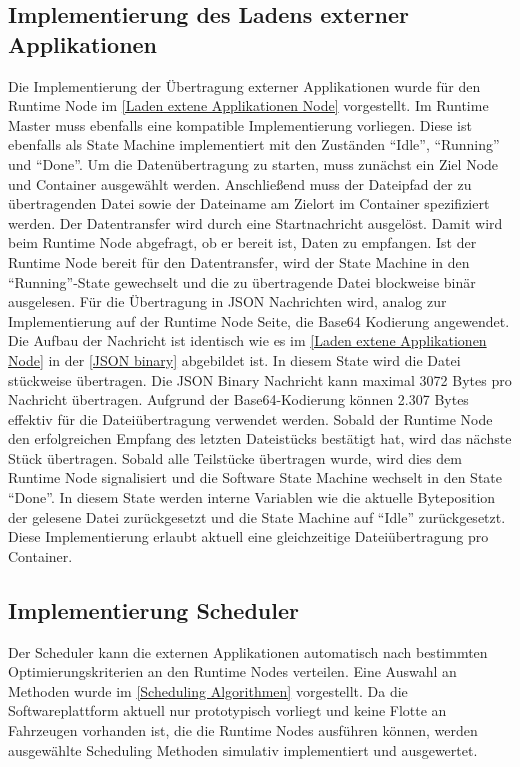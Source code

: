 \subsection{Implementierung des Ladens externer Applikationen}

Die Implementierung der Übertragung externer Applikationen wurde für den Runtime Node im \autoref{Laden extene Applikationen Node} vorgestellt. Im Runtime Master muss ebenfalls eine kompatible Implementierung vorliegen. Diese ist ebenfalls als State Machine implementiert mit den Zuständen \enquote{Idle}, \enquote{Running} und \enquote{Done}. Um die Datenübertragung zu starten, muss zunächst ein Ziel Node und  Container ausgewählt werden. Anschließend muss der Dateipfad der zu übertragenden Datei sowie der Dateiname am Zielort im Container spezifiziert werden. Der Datentransfer wird durch eine Startnachricht ausgelöst. Damit wird beim Runtime Node abgefragt, ob er bereit ist, Daten zu empfangen. Ist der Runtime Node bereit für den Datentransfer, wird der State Machine in den \enquote{Running}-State gewechselt und die zu übertragende Datei blockweise binär ausgelesen. Für die Übertragung in \gls{JSON} Nachrichten wird, analog zur Implementierung auf der Runtime Node Seite, die Base64 Kodierung angewendet. Die Aufbau der Nachricht ist identisch wie es im \autoref{Laden extene Applikationen Node} in der \autoref{JSON binary} abgebildet ist. In diesem State wird die Datei stückweise übertragen. Die \gls{JSON} Binary Nachricht kann maximal 3072 Bytes pro Nachricht übertragen. Aufgrund der Base64-Kodierung können 2.307 Bytes effektiv für die Dateiübertragung verwendet werden. Sobald der Runtime Node den erfolgreichen Empfang des letzten Dateistücks bestätigt hat, wird das nächste Stück übertragen. Sobald alle Teilstücke übertragen wurde, wird dies dem Runtime Node signalisiert und die Software State Machine wechselt in den State \enquote{Done}. In diesem State werden interne Variablen wie die aktuelle Byteposition der gelesene Datei zurückgesetzt und die State Machine auf \enquote{Idle} zurückgesetzt. Diese Implementierung erlaubt aktuell eine gleichzeitige Dateiübertragung pro Container.

\subsection{Implementierung Scheduler}

Der Scheduler kann die externen Applikationen automatisch nach bestimmten Optimierungskriterien an den Runtime Nodes verteilen. Eine Auswahl an Methoden wurde im \autoref{Scheduling Algorithmen} vorgestellt. Da die Softwareplattform aktuell nur prototypisch vorliegt und keine Flotte an Fahrzeugen vorhanden ist, die die Runtime Nodes ausführen können, werden ausgewählte Scheduling Methoden simulativ implementiert und ausgewertet.

